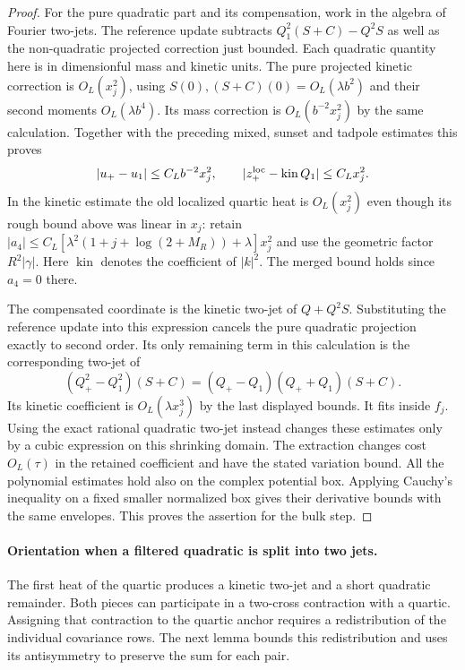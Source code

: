 \documentclass[11pt]{article}
\theoremstyle{definition}
\begin{document}
\begin{proof}
For the pure quadratic part and its compensation, work
in the algebra of Fourier two-jets. The reference update
subtracts \(Q_1^2(S+C)-Q^2S\) as well as the non-quadratic
projected correction just bounded. Each quadratic
quantity here is in dimensionful mass and kinetic units.
The pure projected kinetic correction is \(O_L(x_j^2)\),
using \(S(0), (S+C)(0)=O_L(\lambda b^2)\) and their
second moments \(O_L(\lambda b^4)\).
Its mass correction is \(O_L(b^{-2}x_j^2)\) by the
same calculation. Together with the preceding mixed,
sunset and tadpole estimates this proves
\begin{equation}
 |u_+-u_1|\le C_L b^{-2}x_j^2,\qquad
 |z^{\rm loc}_+-\operatorname{kin}Q_1|\le C_L x_j^2 .
\end{equation}
In the kinetic estimate the old localized quartic heat is
\(O_L(x_j^2)\) even though its rough bound above was
linear in \(x_j\): retain
\(|a_4|\le C_L[\lambda^2(1+j+\log(2+M_R))+\lambda]x_j^2\)
and use the geometric factor \(R^2|\gamma|\).
Here \(\operatorname{kin}\) denotes the coefficient of
\(|k|^2\). The merged bound holds since \(a_4=0\) there.

The compensated coordinate is the kinetic two-jet of
\(Q+Q^2S\). Substituting the reference update into this
expression cancels the pure quadratic projection
exactly to second order. Its only remaining term in
this calculation is the corresponding two-jet of
\begin{equation}
 (Q_+^2-Q_1^2)(S+C)
     = (Q_+-Q_1)(Q_++Q_1)(S+C).
\end{equation}
Its kinetic coefficient is \(O_L(\lambda x_j^3)\)
by the last displayed bounds. It fits inside \(f_j\).
Using the exact rational quadratic two-jet instead
changes these estimates only by a cubic expression on
this shrinking domain. The extraction changes cost
\(O_L(\tau)\) in the retained coefficient and have the
stated variation bound. All the polynomial estimates
hold also on the complex potential box. Applying
Cauchy's inequality on a fixed smaller normalized box
gives their derivative bounds with the same envelopes.
This proves the assertion for the bulk step.
\end{proof}

\paragraph{Orientation when a filtered quadratic is split into two jets.}
The first heat of the quartic produces a kinetic two-jet and a
short quadratic remainder. Both pieces can participate in a
two-cross contraction with a quartic. Assigning that contraction
to the quartic anchor requires a redistribution of the individual
covariance rows. The next lemma bounds this redistribution and
uses its antisymmetry to preserve the sum for each pair.
\end{document}
